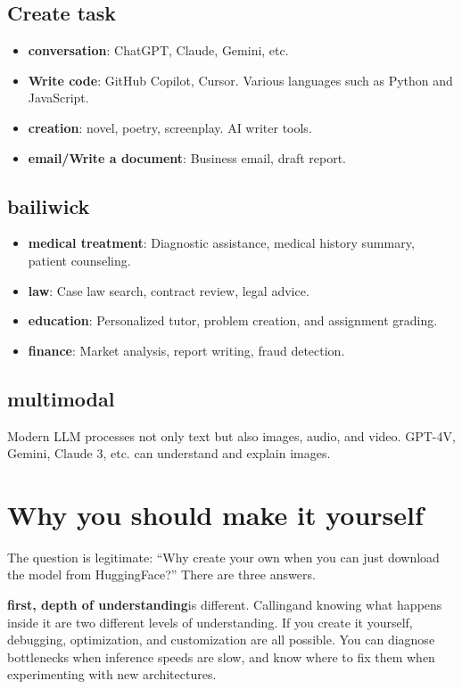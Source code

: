 \subsection{Create task}
\begin{itemize}
\item\textbf{conversation}: ChatGPT, Claude, Gemini, etc.
\item\textbf{Write code}: GitHub Copilot, Cursor. Various languages ​​such as Python and JavaScript.
\item\textbf{creation}: novel, poetry, screenplay. AI writer tools.
\item\textbf{email/Write a document}: Business email, draft report.
\end{itemize}

\subsection{bailiwick}
\begin{itemize}
\item\textbf{medical treatment}: Diagnostic assistance, medical history summary, patient counseling.
\item\textbf{law}: Case law search, contract review, legal advice.
\item\textbf{education}: Personalized tutor, problem creation, and assignment grading.
\item\textbf{finance}: Market analysis, report writing, fraud detection.
\end{itemize}

\subsection{multimodal}
Modern LLM processes not only text but also images, audio, and video. GPT-4V, Gemini, Claude 3, etc. can understand and explain images.

\section{Why you should make it yourself}

The question is legitimate: ``Why create your own when you can just download the model from HuggingFace?'' There are three answers.

\textbf{first, depth of understanding}is different.  Callingand knowing what happens inside it are two different levels of understanding. If you create it yourself, debugging, optimization, and customization are all possible. You can diagnose bottlenecks when inference speeds are slow, and know where to fix them when experimenting with new architectures.

